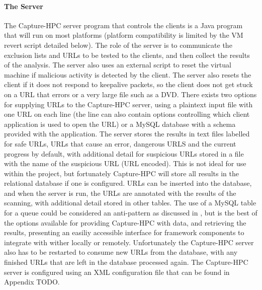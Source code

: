 \paragraph{The Server}
The Capture-HPC server program that controls the clients is a Java program that
will run on most platforms (platform compatibility is limited by the VM revert
script detailed below). The role of the server is to communicate the exclusion
lists and URLs to be tested to the clients, and then collect the results of the
analysis. The server also uses an external script to reset the virtual machine
if malicious activity is detected by the client. The server also resets the
client if it does not respond to keepalive packets, so the client does not get
stuck on a URL that errors or a very large file such as a DVD. There exists two
options for supplying URLs to the
Capture-HPC server, using a plaintext input file with one URL on each line (the
line can also contain options controlling which client application is used to
open the URL) or a MySQL database with a schema provided with the application.
The server stores the results in text files labelled for safe URLs, URLs that
cause an error, dangerous URLS and the current
progress by default, with additional detail for suspicious URLs stored in a file
with the name of the suspicious URL (URL encoded). This is not ideal for use within
the project, but fortunately Capture-HPC will store all results in the
relational database if one is configured. URLs can be inserted into the
database, and when the server is run, the URLs are annotated with the results of
the scanning, with additional detail stored in other tables.
The use of a MySQL table for a queue
could be considered an anti-pattern as discussed in \cite{anti-queue}, but is the best of
the options available for providing Capture-HPC with data, and retrieving the
results, presenting an easiliy accessible interface for framework components to
integrate with wither locally or remotely. Unfortunately the Capture-HPC server
also has to be restarted to
consume new URLs from the database, with any finished URLs that are left in the
database processed again. The Capture-HPC server is configured using an XML
configuration file that can be found in Appendix TODO.
